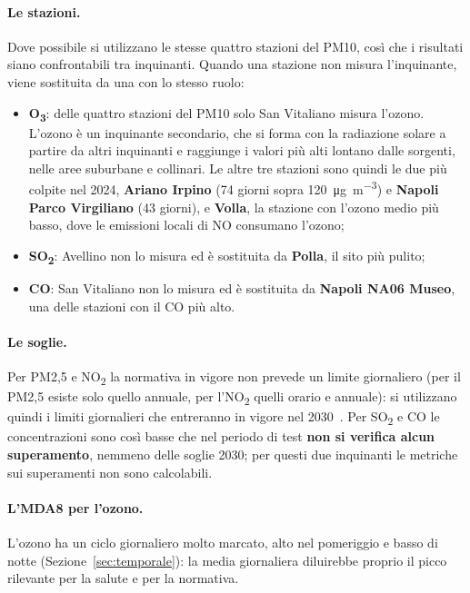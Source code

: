 \documentclass[11pt]{report}
\newcommand{\ugm}{\si{\micro\gram\per\cubic\metre}}
\begin{document}
\paragraph{Le stazioni.} Dove possibile si utilizzano le stesse quattro stazioni del
PM10, così che i risultati siano confrontabili tra inquinanti. Quando una stazione
non misura l'inquinante, viene sostituita da una con lo stesso ruolo:
\begin{itemize}
  \item \textbf{O\textsubscript{3}}: delle quattro stazioni del PM10 solo San
        Vitaliano misura l'ozono. L'ozono è un inquinante secondario, che si forma
        con la radiazione solare a partire da altri inquinanti e raggiunge i valori
        più alti lontano dalle sorgenti, nelle aree suburbane e collinari. Le altre
        tre stazioni sono quindi le due più colpite nel 2024, \textbf{Ariano
        Irpino} (74 giorni sopra 120~\ugm) e \textbf{Napoli Parco Virgiliano}
        (43 giorni), e \textbf{Volla}, la stazione con l'ozono medio più basso, dove
        le emissioni locali di NO consumano l'ozono;
  \item \textbf{SO\textsubscript{2}}: Avellino non lo misura ed è sostituita da
        \textbf{Polla}, il sito più pulito;
  \item \textbf{CO}: San Vitaliano non lo misura ed è sostituita da \textbf{Napoli
        NA06 Museo}, una delle stazioni con il CO più alto.
\end{itemize}

\paragraph{Le soglie.} Per PM2,5 e NO\textsubscript{2} la normativa in vigore non
prevede un limite giornaliero (per il PM2,5 esiste solo quello annuale, per
l'NO\textsubscript{2} quelli orario e annuale): si utilizzano quindi i limiti
giornalieri che entreranno in vigore nel 2030~\cite{direttiva2024}. Per
SO\textsubscript{2} e CO le concentrazioni sono così basse che nel periodo di test
\textbf{non si verifica alcun superamento}, nemmeno delle soglie 2030; per questi
due inquinanti le metriche sui superamenti non sono calcolabili.

\paragraph{L'MDA8 per l'ozono.} L'ozono ha un ciclo giornaliero molto marcato, alto
nel pomeriggio e basso di notte (Sezione~\ref{sec:temporale}): la media giornaliera
diluirebbe proprio il picco rilevante per la salute e per la normativa.
\end{document}
